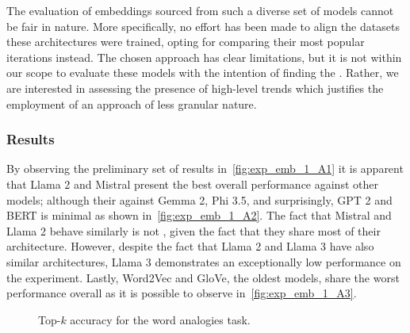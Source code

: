 
The evaluation of embeddings sourced from such a diverse set of models cannot be fair in nature.
More specifically, no effort has been made to align the datasets  these architectures were trained, opting for comparing their most popular iterations instead.
The chosen approach has clear limitations, but it is not within our scope to evaluate these models with the intention of finding the .
Rather, we are interested in assessing the presence of high-level trends which justifies the employment of an approach of less granular nature.

\subsubsection{Results}\label{sssec:exp_emb_exp1_results}

By observing the preliminary set of results in~\cref{fig:exp_emb_1_A1} it is apparent that Llama 2 and Mistral present the best overall performance against other models; although their  against Gemma 2, Phi 3.5, and surprisingly, GPT 2 and BERT is minimal as shown in~\cref{fig:exp_emb_1_A2}.
The fact that Mistral and Llama 2 behave similarly is not , given the fact that they share most of their architecture.
However, despite the fact that Llama 2 and Llama 3 have also similar architectures, Llama 3 demonstrates an exceptionally low performance on the experiment.
Lastly, Word2Vec and GloVe, the oldest models, share the worst performance overall as it is possible to observe in~\cref{fig:exp_emb_1_A3}.

\begin{figure}[t!]
    \centering
    \quad
    \caption{Top-$k$ accuracy for the word analogies task.}
    \label{fig:exp_emb_1_A}
\end{figure}

